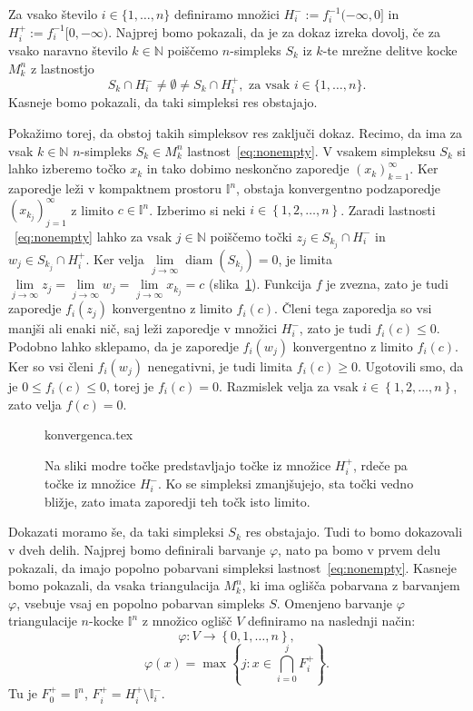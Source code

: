 \documentclass[mat1]{fmfdelo}
\newcommand{\N}{\mathbb N}
\DeclareMathOperator{\diam}{diam}
\newcommand{\I}{\mathbb I}
\newcommand{\0}{0}
\begin{document}
\begin{dokaz}
Za vsako število $i \in \{ 1, \dots, n\}$ definiramo množici $H_i^- := f_i^{-1} (-\infty, 0]$ in $H_i^+ := f_i^{-1} [0, -\infty)$. Najprej bomo pokazali, da je za dokaz izreka dovolj, če za vsako naravno število $k \in \N$ poiščemo $n$-simpleks $S_k$ iz $k$-te mrežne delitve kocke $M_k^n$ z lastnostjo 
\begin{equation}\label{eq:nonempty}
S_k \cap H_i^- \neq \emptyset \neq S_k \cap H_i^+, \text{ za vsak } i \in \{ 1, \dots, n \}.
\end{equation}
Kasneje bomo pokazali, da taki simpleksi res obstajajo.

Pokažimo torej, da obstoj takih simpleksov res zaključi dokaz. Recimo, da ima za vsak $k \in \N$ $n$-simpleks $S_k \in M_k^n$ lastnost~\eqref{eq:nonempty}. V vsakem simpleksu $S_k$ si lahko izberemo točko $x_k$ in tako dobimo neskončno zaporedje $\left ( x_k \right ) _{k = 1}^{\infty}$. Ker zaporedje leži v kompaktnem prostoru $\I^n$, obstaja konvergentno podzaporedje $\left ( x_{k_j} \right ) _{j = 1}^{\infty}$ z limito $c \in \I^n$. Izberimo si neki $i \in \left \{1, 2, \dots, n\right \}$. Zaradi lastnosti ~\eqref{eq:nonempty} lahko za vsak $j \in \N$ poiščemo točki $z_j \in S_{k_j} \cap H_i^-$ in $w_j \in S_{k_j} \cap H_i^+$. Ker velja $\lim\limits_{j \to \infty} \diam(S_{k_j}) = 0$, je limita  $\lim\limits_{j \to \infty} z_j = \lim\limits_{j \to \infty} w_j = \lim\limits_{j \to \infty} x_{k_j} = c$ (slika~\ref{fig:istalimita}). Funkcija $f$ je zvezna, zato je tudi zaporedje $f_i(z_j)$ konvergentno z limito $f_i(c)$. Členi tega zaporedja so vsi manjši ali enaki nič, saj leži zaporedje v množici $H_i^-$, zato je tudi $f_i(c) \leq 0$. Podobno lahko sklepamo, da je zaporedje $f_i(w_j)$ konvergentno z limito $f_i(c)$. Ker so vsi členi $f_i(w_j)$ nenegativni, je tudi limita $f_i(c) \geq 0$. Ugotovili smo, da je $0 \leq f_i(c) \leq 0$, torej je $f_i(c) = 0$. Razmislek velja za vsak $i \in \left \{1, 2, \dots, n\right \}$, zato velja $f(c) = \0$.
\begin{figure}[h!]
	\centering
	{konvergenca.tex}%
	\caption{Na sliki modre točke predstavljajo točke iz množice $H_i^+$, rdeče pa točke iz množice $H_i^-$. Ko se simpleksi zmanjšujejo, sta točki vedno bližje, zato imata zaporedji teh točk isto limito.}\label{fig:istalimita}
\end{figure}
Dokazati moramo še, da taki simpleksi $S_k$ res obstajajo. Tudi to bomo dokazovali v dveh delih. Najprej bomo definirali barvanje $\varphi$, nato pa bomo v prvem delu pokazali, da imajo popolno pobarvani simpleksi lastnost~\eqref{eq:nonempty}. Kasneje bomo pokazali, da vsaka triangulacija $M_k^n$, ki ima oglišča pobarvana z barvanjem $\varphi$, vsebuje vsaj en popolno pobarvan simpleks $S$.
Omenjeno barvanje $\varphi$ triangulacije $n$-kocke $\I^n$ z množico oglišč $V$ definiramo na naslednji način:
$$\varphi : V \to \left \{ 0, 1, \dots, n \right \},$$
$$\varphi(x) = \max \left \{ j : x \in \bigcap_{i=0}^j F_i^+\right \}.$$
Tu je $ F_0^+ = \I^n$, $ F_i^+ =  H_i^+ \setminus \I_i^-$.


\end{dokaz}
\end{document}
